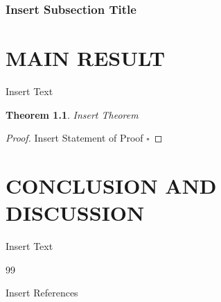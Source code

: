 \documentclass[12pt,a4paper,oneside]{book}
\theoremstyle{plain}
\newtheorem{thm}{Theorem}[chapter]
\numberwithin{equation}{chapter} \DeclareMathOperator{\Var}{Var}
\newcommand*{\QEDAa}{\hfill\ensuremath{\square}}
\begin{document}
\subsection{Insert Subsection Title}\label{sub3.2.2}

\chapter{MAIN RESULT}

Insert Text
 
 \begin{thm}\label{thmx}
 	Insert Theorem
 \end{thm}
 
 \noindent\begin{proof}
 	Insert Statement of Proof
 	\QEDAa
 \end{proof}

\chapter{CONCLUSION AND DISCUSSION}
Insert Text



\begin{thebibliography}{99}

Insert References
\end{thebibliography}
\end{document}
